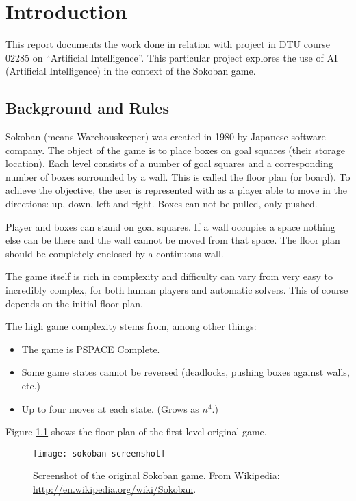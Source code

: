 \chapter{Introduction}

This report documents the work done in relation with project in DTU
course 02285 on ``Artificial Intelligence''.  This particular project
explores the use of AI (Artificial Intelligence) in the context of the
Sokoban game.

\section{Background and Rules}
\label{sec:rules}

Sokoban (means Warehouskeeper) was created in 1980 by Japanese
software company. The object of the game is to place boxes on goal
squares (their storage location).  Each level consists of a number of
goal squares and a corresponding number of boxes sorrounded by a
wall. This is called the floor plan (or board). To achieve the
objective, the user is represented with as a player able to move in
the directions: up, down, left and right. Boxes can not be pulled,
only pushed. \citep{cgw:sokoban}


Player and boxes can stand on goal squares. If a wall occupies a space
nothing else can be there and the wall cannot be moved from that
space.  The floor plan should be completely enclosed by a continuous
wall.

The game itself is rich in complexity and difficulty can vary from
very easy to incredibly complex, for both human players and automatic
solvers. This of course depends on the initial floor plan.

The high game complexity stems from, among other things:
\begin{itemize}
\item The game is PSPACE Complete. \cite{culberson97sokobanpspace}
\item Some game states cannot be reversed (deadlocks, pushing boxes
  against walls, etc.)
\item Up to four moves at each state. (Grows as $n^4$.)
\end{itemize}


Figure \ref{fig:soko-org-screen} shows the floor plan of the first
level original game.

\begin{figure}
  \centering
  \texttt{[image: sokoban-screenshot]}
  \caption{Screenshot of the original Sokoban game. From Wikipedia:
    \url{http://en.wikipedia.org/wiki/Sokoban}.}
  \label{fig:soko-org-screen}
\end{figure}

